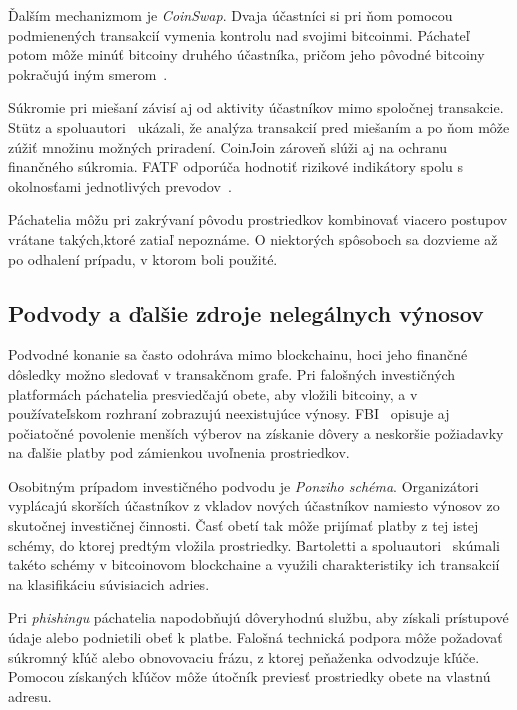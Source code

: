 Ďalším mechanizmom je \emph{CoinSwap}. Dvaja účastníci si pri ňom
pomocou podmienených transakcií vymenia kontrolu nad svojimi
bitcoinmi. Páchateľ potom môže minúť bitcoiny druhého účastníka,
pričom jeho pôvodné bitcoiny pokračujú iným
smerom~\cite{teleportCoinSwap}.

Súkromie pri miešaní závisí aj od aktivity účastníkov mimo
spoločnej transakcie. Stütz a spoluautori~\cite{stutz2022coinjoin} ukázali, že analýza
transakcií pred miešaním a po ňom môže zúžiť množinu možných
priradení. CoinJoin zároveň slúži aj na ochranu finančného súkromia.
FATF odporúča hodnotiť rizikové indikátory spolu s okolnosťami
jednotlivých prevodov~\cite{fatf2020redflags}.

Páchatelia môžu pri zakrývaní pôvodu prostriedkov kombinovať viacero
postupov vrátane takých,ktoré zatiaľ nepoznáme. O niektorých spôsoboch
sa dozvieme až po odhalení prípadu, v ktorom boli použité.

\subsection{Podvody a ďalšie zdroje nelegálnych výnosov}
\label{sec:bitcoin-fraud}

Podvodné konanie sa často odohráva mimo blockchainu, hoci jeho
finančné dôsledky možno sledovať v transakčnom grafe. Pri falošných
investičných platformách páchatelia presviedčajú obete, aby vložili
bitcoiny, a v používateľskom rozhraní zobrazujú neexistujúce
výnosy. FBI~\cite{fbiCryptoInvestmentFraud} opisuje aj počiatočné
povolenie menších výberov na získanie dôvery a neskoršie požiadavky
na ďalšie platby pod zámienkou uvoľnenia prostriedkov.

Osobitným prípadom investičného podvodu je \emph{Ponziho schéma}.
Organizátori vyplácajú skorších účastníkov z vkladov nových
účastníkov namiesto výnosov zo skutočnej investičnej činnosti.
Časť obetí tak môže prijímať platby z tej istej schémy, do ktorej
predtým vložila prostriedky. Bartoletti
a spoluautori~\cite{bartoletti2018ponzi} skúmali takéto schémy
v bitcoinovom blockchaine a využili charakteristiky ich transakcií
na klasifikáciu súvisiacich adries.

Pri \emph{phishingu} páchatelia napodobňujú dôveryhodnú službu,
aby získali prístupové údaje alebo podnietili obeť k platbe.
Falošná technická podpora môže požadovať súkromný kľúč alebo
obnovovaciu frázu, z ktorej peňaženka odvodzuje kľúče.
Pomocou získaných kľúčov môže útočník previesť prostriedky obete
na vlastnú adresu.

